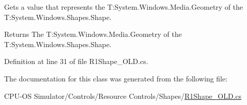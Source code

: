 Gets a value that represents the T\+:\+System.\+Windows.\+Media.\+Geometry of the T\+:\+System.\+Windows.\+Shapes.\+Shape. 

\begin{DoxyReturn}{Returns}
The T\+:\+System.\+Windows.\+Media.\+Geometry of the T\+:\+System.\+Windows.\+Shapes.\+Shape. 
\end{DoxyReturn}


Definition at line 31 of file R1\+Shape\+\_\+\+O\+L\+D.\+cs.



The documentation for this class was generated from the following file\+:\begin{DoxyCompactItemize}
\item 
C\+P\+U-\/\+O\+S Simulator/\+Controls/\+Resource Controls/\+Shapes/\hyperlink{_r1_shape___o_l_d_8cs}{R1\+Shape\+\_\+\+O\+L\+D.\+cs}\end{DoxyCompactItemize}
